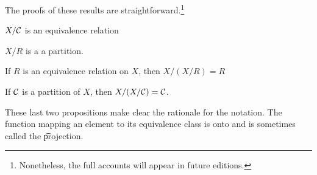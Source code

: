 
The proofs of these results are straightforward.\footnote{Nonetheless, the full accounts will appear in future editions.}

\begin{proposition}
  $X/\mathcal{C}$ is an equivalence relation
\end{proposition}
\begin{proposition}
  $X/R$ is a a partition.
\end{proposition}

\begin{proposition}
  If $R$ is an equivalence relation on $X$, then $X/(X/R) = R$
\end{proposition}

\begin{proposition}
  If $\mathcal{C}$ is a partition of $X$, then $X/(X/\mathcal{C}) = \mathcal{C}$.
\end{proposition}

These last two propositions make clear the rationale for the notation.
The function mapping an element to its equivalence class is onto and is sometimes called the \t{projection}.



%
%
%
%
%
%
%
%
